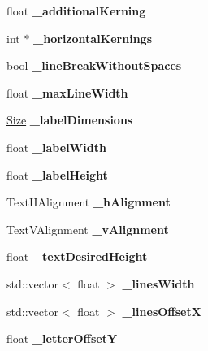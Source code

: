 \begin{DoxyCompactItemize}
float {\bfseries \+\_\+additional\+Kerning}
\item 
\mbox{\label{classLabel_a455b7b0be9081c199cd0efc9f7f4742a}} 
int $\ast$ {\bfseries \+\_\+horizontal\+Kernings}
\item 
\mbox{\label{classLabel_af1ed8e9c3c11c6bca6ec0c8a745a03ef}} 
bool {\bfseries \+\_\+line\+Break\+Without\+Spaces}
\item 
\mbox{\label{classLabel_a8444497f625f996d88d82a53f4c01ae1}} 
float {\bfseries \+\_\+max\+Line\+Width}
\item 
\mbox{\label{classLabel_a74f00a6dc0ffe9010e20e9eea26fcca9}} 
\hyperlink{classSize}{Size} {\bfseries \+\_\+label\+Dimensions}
\item 
\mbox{\label{classLabel_a43d97d3dc4010661fd54585637520467}} 
float {\bfseries \+\_\+label\+Width}
\item 
\mbox{\label{classLabel_a8c00a7702f29cb21205db4b1a4126da5}} 
float {\bfseries \+\_\+label\+Height}
\item 
\mbox{\label{classLabel_abf47f481517f766935759b3afcc28891}} 
Text\+H\+Alignment {\bfseries \+\_\+h\+Alignment}
\item 
\mbox{\label{classLabel_a898b8d84decbfba6bae3bbd8a7186f0f}} 
Text\+V\+Alignment {\bfseries \+\_\+v\+Alignment}
\item 
\mbox{\label{classLabel_ad72f071b52afbdf3257c8a20ede586e1}} 
float {\bfseries \+\_\+text\+Desired\+Height}
\item 
\mbox{\label{classLabel_a9b83c4a1c853597e2bef098cb16d8df9}} 
std\+::vector$<$ float $>$ {\bfseries \+\_\+lines\+Width}
\item 
\mbox{\label{classLabel_adfb45ef9dd4c416d192d71bfcc91a621}} 
std\+::vector$<$ float $>$ {\bfseries \+\_\+lines\+OffsetX}
\item 
\mbox{\label{classLabel_a41d366b74aa1999c0991026117d4074b}} 
float {\bfseries \+\_\+letter\+OffsetY}

\end{DoxyCompactItemize}
